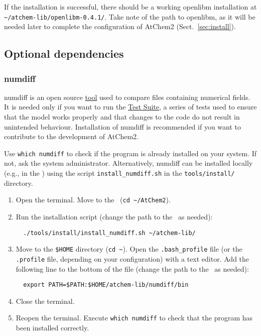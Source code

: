 If the installation is successful, there should be a working openlibm
installation at \texttt{\textasciitilde/atchem-lib/openlibm-0.4.1/}.
Take note of the path to openlibm, as it will be needed later to
complete the configuration of AtChem2 (Sect.~\ref{sec:install}).

\subsection{Optional dependencies} \label{subsec:optional-dependencies}

\subsubsection{numdiff}

numdiff is an open source \href{https://www.nongnu.org/numdiff/}{tool}
used to compare files containing numerical fields. It is needed only
if you want to run the \hyperref[sec:test-suite]{Test Suite}, a series
of tests used to ensure that the model works properly and that changes
to the code do not result in unintended behaviour. Installation of
numdiff is recommended if you want to contribute to the development of
AtChem2.

Use \verb|which numdiff| to check if the program is already installed
on your system. If not, ask the system administrator. Alternatively,
numdiff can be installed locally (e.g., in the \depdir) using the
script \texttt{install\_numdiff.sh} in the \texttt{tools/install/}
directory.

\begin{enumerate}
\item Open the terminal. Move to the \maindir\ (\verb|cd ~/AtChem2|).
\item Run the installation script (change the path to the \depdir\ as
  needed):
  \begin{verbatim}
  ./tools/install/install_numdiff.sh ~/atchem-lib/
  \end{verbatim}
\item Move to the \texttt{\$HOME} directory (\texttt{cd\ \textasciitilde}).
  Open the \texttt{.bash\_profile} file (or the \texttt{.profile}
  file, depending on your configuration) with a text editor. Add the
  following line to the bottom of the file (change the path to the
  \depdir\ as needed):
  \begin{verbatim}
  export PATH=$PATH:$HOME/atchem-lib/numdiff/bin
  \end{verbatim}
\item Close the terminal.
\item Reopen the terminal. Execute \verb|which numdiff| to check that
  the program has been installed correctly.
\end{enumerate}

